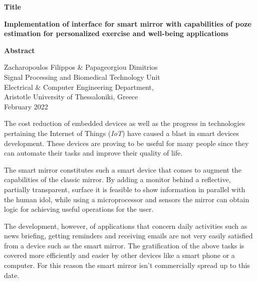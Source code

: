 {\selectfont

{}


\begin{center}
  \centering
  \textbf{\Large{Title}}
  \vspace{0.5cm}

  \textbf{\large{Implementation of interface for smart mirror with capabilities of poze estimation for personalized exercise and well-being applications}}

  \vspace{1cm}

  \centering
  \textbf{Abstract}
\end{center}


\begin{flushright}
  \vspace{2cm}
  Zacharopoulos Filippos \& Papageorgiou Dimitrios
  \\
  Signal Processing and Biomedical Technology Unit
  \\
  Electrical \& Computer Engineering Department,
  \\
  Aristotle University of Thessaloniki, Greece
  \\
  February 2022
\end{flushright}

}

The cost reduction of embedded devices as well as the progress in technologies pertaining the Internet of Things (\textit{IoT}) have caused a blast in smart devices development. These devices are proving to be useful for many people since they can automate their tasks and improve their quality of life.

The smart mirror constitutes such a smart device that comes to augment the capabilities of the classic mirror. By adding a monitor behind a reflective, partially transparent, surface it is feasible to show information in parallel with the human idol, while using a microprocessor and sensors the mirror can obtain logic for achieving useful operations for the user.

The development, however, of applications that concern daily activities such as news briefing, getting reminders and receiving emails are not very easily satisfied from a device such as the smart mirror. The gratification of the above tasks is covered more efficiently and easier by other devices like a smart phone or a computer. For this reason the smart mirror isn't commercially spread up to this date.

